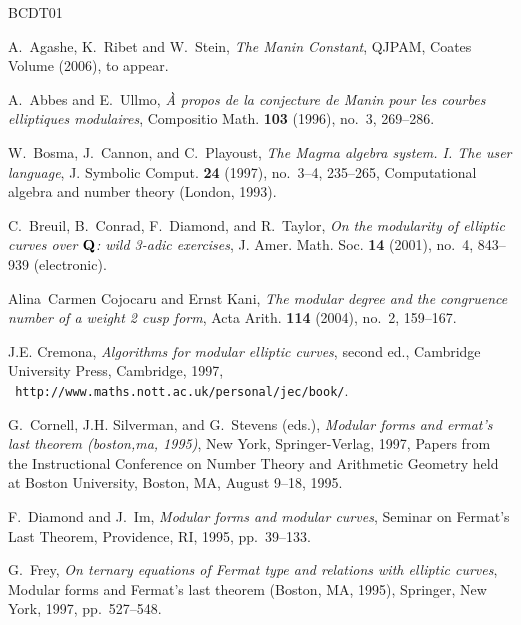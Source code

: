 \documentclass[10pt,twoside]{article}
\theoremstyle{definition}
\begin{document}
\providecommand{\bysame}{\leavevmode\hbox to3em{\hrulefill}\thinspace}
\providecommand{\MR}{\relax\ifhmode\unskip\space\fi MR }
\providecommand{\MRhref}[2]{%
  \href{http://www.ams.org/mathscinet-getitem?mr=#1}{#2}
}
\providecommand{\href}[2]{#2}
\begin{thebibliography}{BCDT01}

A.~Agashe, K.~Ribet and W.~Stein, 
\emph{The {M}anin {C}onstant}, QJPAM, Coates Volume (2006), to appear. 

A.~Abbes and E.~Ullmo, \emph{\`{A} propos de la conjecture de {M}anin pour les
  courbes elliptiques modulaires}, Compositio Math. \textbf{103} (1996), no.~3,
  269--286. 

W.~Bosma, J.~Cannon, and C.~Playoust, \emph{The {M}agma algebra system. {I}.
  {T}he user language}, J. Symbolic Comput. \textbf{24} (1997), no.~3--4,
  235--265, Computational algebra and number theory (London, 1993). 

C.~Breuil, B.~Conrad, F.~Diamond, and R.~Taylor, \emph{On the modularity of
  elliptic curves over {$\bold Q$}: wild 3-adic exercises}, J. Amer. Math. Soc.
  \textbf{14} (2001), no.~4, 843--939 (electronic). %

Alina~Carmen Cojocaru and Ernst Kani, \emph{The modular degree and the
  congruence number of a weight 2 cusp form}, Acta Arith. \textbf{114} (2004),
  no.~2, 159--167. 

J.\thinspace{}E. Cremona, \emph{Algorithms for modular elliptic curves}, second
  ed., Cambridge University Press, Cambridge, 1997, \mbox{}\\{\tt
  http://www.maths.nott.ac.uk/personal/jec/book/}.

G.~Cornell, J.\thinspace{}H. Silverman, and G.~Stevens (eds.), \emph{Modular
  forms and ermat's last theorem (boston,ma, 1995)}, New York,
  Springer-Verlag, 1997, Papers from the Instructional Conference on Number
  Theory and Arithmetic Geometry held at Boston University, Boston, MA, August
  9--18, 1995.


F.~Diamond and J.~Im, \emph{Modular forms and modular curves}, Seminar on
  {F}ermat's {L}ast {T}heorem, Providence, RI, 1995, pp.~39--133.

G.~Frey, \emph{On ternary equations of {F}ermat type and relations with
  elliptic curves}, Modular forms and Fermat's last theorem (Boston, MA, 1995),
  Springer, New York, 1997, pp.~527--548. 


\end{thebibliography}
\end{document}
